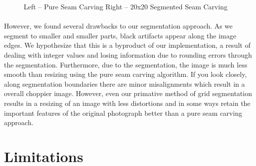 \documentclass[conference]{acmsiggraph}
\begin{document}
\begin{figure}[!ht] 
    \caption{Left -- Pure Seam Carving Right -- 20x20 Segmented Seam Carving}
    \label{fig:leopard_lady_compare}
\end{figure}
\paragraph{}
However, we found several drawbacks to our segmentation approach.  As we segment to smaller and smaller parts, black artifacts appear along the image edges. We hypothesize that this is a byproduct of our implementation, a result of dealing with integer values and losing information due to rounding errors through the segmentation.  Furthermore, due to the segmentation, the image is much less smooth than resizing using the pure seam carving algorithm.  If you look closely, along segmentation boundaries there are minor misalignments which result in a overall choppier image.   However, even our primative method of grid segmentation results in a resizing of an image with less distortions and in some ways retain the important features of the original photograph better than a pure seam carving approach.


\section{Limitations}
\end{document}
